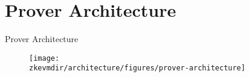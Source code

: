 
\section{Prover Architecture}
\begin{frame}{Prover Architecture}
\begin{figure}
\texttt{[image: \\zkevmdir/architecture/figures/prover-architecture]}
\end{figure}
\end{frame}